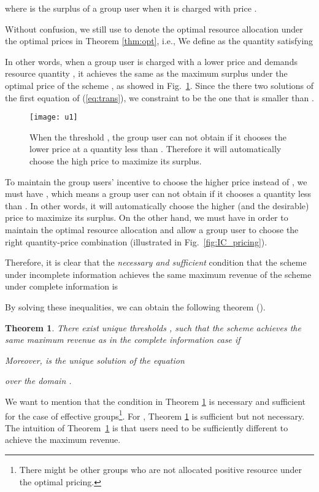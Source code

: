 \documentclass[twocolumn,10pt,twosided]{IEEEtran}
\newtheorem{theorem}{Theorem}
\begin{document}
where  is the surplus of
a group  user when it is charged with price .

Without confusion, we still use  to denote the optimal resource allocation
under the optimal prices in Theorem \ref{thm:opt}, i.e.,
 We define  as the quantity satisfying

In other words, when a group  user is charged with a lower price
 and demands resource quantity , it
achieves the same as the maximum surplus under the optimal price of the  scheme ,
as showed in Fig.~\ref{fig:utility}.  Since the there two solutions of the first equation of (\ref{eq:trans}), we constraint  to be the one that is smaller than .
\begin{figure}[ht]
 \centering
\texttt{[image: u1]}
\caption{When the threshold , the
group  user can not obtain  if it chooses the
lower price  at a quantity less than . Therefore
it will automatically choose the high price  to maximize its
surplus. } \label{fig:utility}
\end{figure}

To maintain the group  users' incentive to choose the higher
price  instead of , we must have , which means a group  user can not obtain
 if it chooses a quantity less than
. In other words, it will automatically choose the
higher (and the desirable) price  to maximize its surplus.
On the other hand, we must have  in order to maintain the optimal resource allocation and allow a group  user to choose the right quantity-price combination (illustrated in Fig.~\ref{fig:IC_pricing}).

Therefore, it is clear that the \emph{necessary and sufficient}
condition that the  scheme under incomplete information achieves the same maximum revenue of the  scheme
under complete information is

By solving these inequalities, we can obtain the following theorem
().

\begin{theorem}
\label{the:IC}
There exist unique thresholds , such that the  scheme achieves
the same maximum revenue as in the complete information case if

 Moreover,  is the unique solution of
the equation

over the domain .
\end{theorem}

We want to mention that the condition in Theorem \ref{the:IC} is
necessary and sufficient for the case of  effective
groups\footnote{There might be other groups who are not allocated
positive resource under the optimal pricing.}. For , Theorem
\ref{the:IC} is sufficient but not necessary. The intuition of Theorem~\ref{the:IC} is that users need to be sufficiently different to achieve the maximum revenue.
\end{document}
